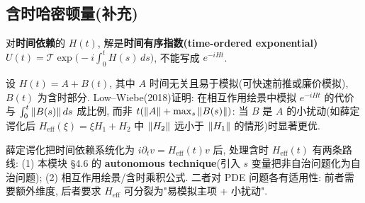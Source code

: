 \documentclass[utf8]{article} %
\numberwithin{equation}{section}   %
\newtheorem{Note}{\hskip 2em {\color{red} 注}}[subsection]
\begin{document}
\subsection{含时哈密顿量(补充)}

对\textbf{时间依赖}的 $H(t)$, 解是\textbf{时间有序指数(time-ordered exponential)}
$U(t) = \mathcal{T}\exp\big(-i\int_0^t H(s)\,ds\big)$, 不能写成 $e^{-iHt}$.
\begin{Note}
    设 $H(t) = A + B(t)$, 其中 $A$ 时间无关且易于模拟(可快速前推或廉价模拟),
    $B(t)$ 为含时部分. Low--Wiebe(2018)证明: 在相互作用绘景中模拟 $e^{-iHt}$ 的代价
    与 $\int_0^t \norm{B(s)}\,ds$ 成比例, 而非 $t(\norm{A} + \max_s\norm{B(s)})$:
    当 $B$ 是 $A$ 的小扰动(如薛定谔化后 $H_{\mathrm{eff}}(\xi) = \xi H_1 + H_2$
    中 $\norm{H_2}$ 远小于 $\norm{H_1}$ 的情形)时显著更优.
\end{Note}
\begin{Note}[与薛定谔化管线的衔接]
    薛定谔化把时间依赖系统化为 $i\partial_t v = H_{\mathrm{eff}}(t)v$ 后,
    处理含时 $H_{\mathrm{eff}}(t)$ 有两条路线: (1) 本模块 §4.6 的
    \textbf{autonomous technique}(引入 $s$ 变量把非自治问题化为自治问题);
    (2) 相互作用绘景/含时乘积公式. 二者对 PDE 问题各有适用性:
    前者需要额外维度, 后者要求 $H_{\mathrm{eff}}$ 可分裂为"易模拟主项 + 小扰动".
\end{Note}
\end{document}
